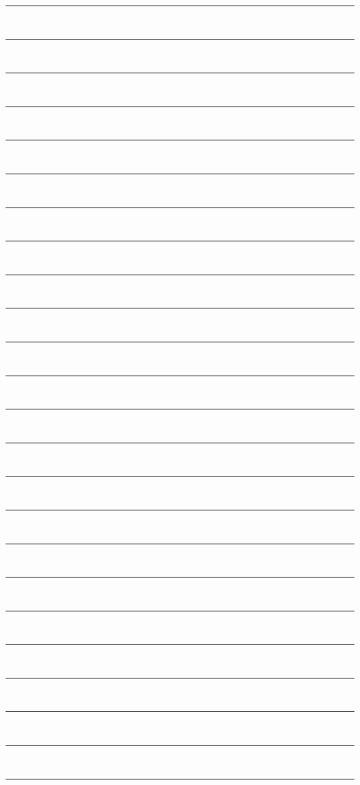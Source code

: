 \noindent\rule{\textwidth}{1pt}\\
\noindent\rule{\textwidth}{1pt}\\
\noindent\rule{\textwidth}{1pt}\\
\noindent\rule{\textwidth}{1pt}\\
\noindent\rule{\textwidth}{1pt}\\
\noindent\rule{\textwidth}{1pt}\\
\noindent\rule{\textwidth}{1pt}\\
\noindent\rule{\textwidth}{1pt}\\
\noindent\rule{\textwidth}{1pt}\\
\noindent\rule{\textwidth}{1pt}\\
\noindent\rule{\textwidth}{1pt}\\
\noindent\rule{\textwidth}{1pt}\\
\noindent\rule{\textwidth}{1pt}\\
\noindent\rule{\textwidth}{1pt}\\
\noindent\rule{\textwidth}{1pt}\\
\noindent\rule{\textwidth}{1pt}\\
\noindent\rule{\textwidth}{1pt}\\
\noindent\rule{\textwidth}{1pt}\\
\noindent\rule{\textwidth}{1pt}\\
\noindent\rule{\textwidth}{1pt}\\
\noindent\rule{\textwidth}{1pt}\\
\noindent\rule{\textwidth}{1pt}\\
\noindent\rule{\textwidth}{1pt}\\
\noindent\rule{\textwidth}{1pt}\\\
